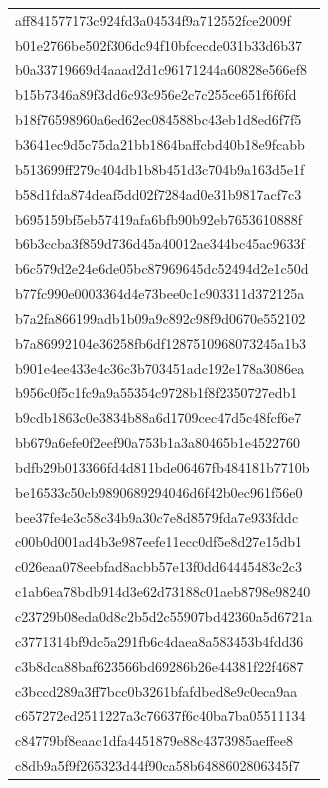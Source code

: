 \begin{tabular}{l}
aff841577173c924fd3a04534f9a712552fce2009f \\
b01e2766be502f306dc94f10bfcecde031b33d6b37 \\
b0a33719669d4aaad2d1c96171244a60828e566ef8 \\
b15b7346a89f3dd6c93c956e2c7c255ce651f6f6fd \\
b18f76598960a6ed62ec084588bc43eb1d8ed6f7f5 \\
b3641ec9d5c75da21bb1864baffcbd40b18e9fcabb \\
b513699ff279c404db1b8b451d3c704b9a163d5e1f \\
b58d1fda874deaf5dd02f7284ad0e31b9817acf7c3 \\
b695159bf5eb57419afa6bfb90b92eb7653610888f \\
b6b3ccba3f859d736d45a40012ae344bc45ac9633f \\
b6c579d2e24e6de05bc87969645dc52494d2e1c50d \\
b77fc990e0003364d4e73bee0c1c903311d372125a \\
b7a2fa866199adb1b09a9c892c98f9d0670e552102 \\
b7a86992104e36258fb6df1287510968073245a1b3 \\
b901e4ee433e4c36c3b703451adc192e178a3086ea \\
b956c0f5c1fc9a9a55354c9728b1f8f2350727edb1 \\
b9cdb1863c0e3834b88a6d1709cec47d5c48fcf6e7 \\
bb679a6efe0f2eef90a753b1a3a80465b1e4522760 \\
bdfb29b013366fd4d811bde06467fb484181b7710b \\
be16533c50cb9890689294046d6f42b0ec961f56e0 \\
bee37fe4e3c58c34b9a30c7e8d8579fda7e933fddc \\
c00b0d001ad4b3e987eefe11ecc0df5e8d27e15db1 \\
c026eaa078eebfad8acbb57e13f0dd64445483c2c3 \\
c1ab6ea78bdb914d3e62d73188c01aeb8798e98240 \\
c23729b08eda0d8c2b5d2c55907bd42360a5d6721a \\
c3771314bf9dc5a291fb6c4daea8a583453b4fdd36 \\
c3b8dca88baf623566bd69286b26e44381f22f4687 \\
c3bccd289a3ff7bcc0b3261bfafdbed8e9c0eca9aa \\
c657272ed2511227a3c76637f6c40ba7ba05511134 \\
c84779bf8eaac1dfa4451879e88c4373985aeffee8 \\
c8db9a5f9f265323d44f90ca58b6488602806345f7 \\

\end{tabular}

